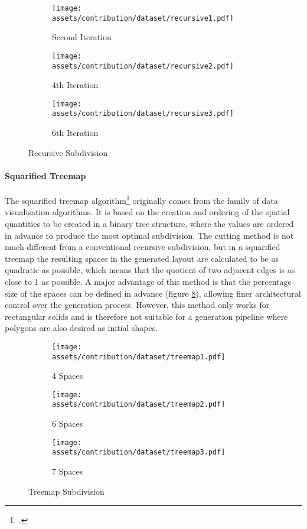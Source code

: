 \documentclass[a4paper, 12pt]{report}
\begin{document}
\begin{figure}
\centering
\begin{subfigure}{.33\textwidth}
\centering
\texttt{[image: assets/contribution/dataset/recursive1.pdf]}
\caption{Second Iteration}
\label{fig:second-iteration-1}
\end{subfigure}%
\begin{subfigure}{.33\textwidth}
\centering
\texttt{[image: assets/contribution/dataset/recursive2.pdf]}
\caption{4th Iteration}
\label{fig:4th-iteration}
\end{subfigure}%
\begin{subfigure}{.33\textwidth}
\centering
\texttt{[image: assets/contribution/dataset/recursive3.pdf]}
\caption{6th Iteration}
\label{fig:6th-iteration}
\end{subfigure}
\caption{Recursive Subdivision}
\label{fig:recursive-subdivision}
\end{figure}

\paragraph{Squarified Treemap}\label{par:squarified-treemap}

The squarified treemap algorithm\footcite{marson2010automatic} originally comes from the family of data visualisation algorithms. It is based on the creation and ordering of the spatial quantities to be created in a \gls{binary tree} structure, where the values are ordered in advance to produce the most optimal subdivision. The cutting method is not much different from a conventional recursive subdivision, but in a squarified treemap the resulting spaces in the generated layout are calculated to be as quadratic as possible, which means that the quotient of two adjacent edges is as close to 1 as possible. A major advantage of this method is that the percentage size of the spaces can be defined in advance (figure \ref{fig:treemap-subdivision}), allowing finer architectural control over the generation process. However, this method only works for rectangular solids and is therefore not suitable for a generation pipeline where polygons are also desired as initial shapes.

\begin{figure}
\centering
\begin{subfigure}{.3\textwidth}
\centering
\texttt{[image: assets/contribution/dataset/treemap1.pdf]}
\caption{4 Spaces}
\label{fig:4-spaces}
\end{subfigure}%
\begin{subfigure}{.34\textwidth}
\centering
\texttt{[image: assets/contribution/dataset/treemap2.pdf]}
\caption{6 Spaces}
\label{fig:6-spaces}
\end{subfigure}%
\begin{subfigure}{.36\textwidth}
\centering
\texttt{[image: assets/contribution/dataset/treemap3.pdf]}
\caption{7 Spaces}
\label{fig:7-spaces}
\end{subfigure}
\caption{Treemap Subdivision}
\label{fig:treemap-subdivision}
\end{figure}
\end{document}
